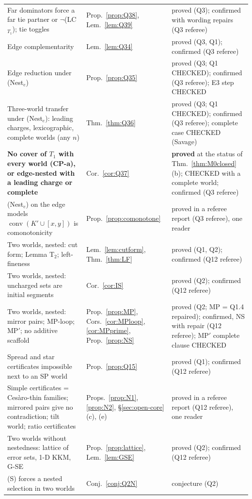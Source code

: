 \documentclass[11pt]{article}
\theoremstyle{definition}
\theoremstyle{remark}
\newcommand{\co}{\operatorname{conv}}
\begin{document}
{\begin{longtable}{>{\raggedright\arraybackslash}p{6.4cm}>{\raggedright\arraybackslash}p{2.1cm}>{\raggedright\arraybackslash}p{5.6cm}}
Far dominators force a far tie partner or $\neg$(LC$_{T_1}$); tie toggles & Prop.~\ref{prop:Q38}, Lem.~\ref{lem:Q39} & proved (Q3); confirmed with wording repairs (Q3 referee)\\
Edge complementarity & Lem.~\ref{lem:Q34} & proved (Q3, Q1); confirmed (Q3 referee)\\
Edge reduction under (Nest$_e$) & Prop.~\ref{prop:Q35} & proved (Q3; Q1 CHECKED); confirmed (Q3 referee); E3 step CHECKED\\
Three-world transfer under (Nest$_e$): leading charges, lexicographic, complete worlds (any $n$) & Thm.~\ref{thm:Q36} & proved (Q3; Q1 CHECKED); confirmed (Q3 referee); complete case CHECKED (Savage)\\
\textbf{No cover of $T_1$ with every world (CP-a), or edge-nested with a leading charge or complete} & Cor.~\ref{cor:Q37} & \textbf{proved} at the status of Thm.~\ref{thm:M0closed}(b); CHECKED with a complete world; confirmed (Q3 referee)\\
(Nest$_e$) on the edge models $\co(K'\cup[x,y])$ is comonotonicity & Prop.~\ref{prop:comonotone} & proved in a referee report (Q3 referee), one reader\\
Two worlds, nested: cut form; Lemma T$_2$; left-fineness & Lem.~\ref{lem:cutform}, Thm.~\ref{thm:LF} & proved (Q1, Q2); confirmed (Q12 referee)\\
Two worlds, nested: uncharged sets are initial segments & Cor.~\ref{cor:IS} & proved (Q2); confirmed (Q12 referee)\\
Two worlds, nested: mirror pairs; MP-loop; MP$'$; no additive scaffold & Prop.~\ref{prop:MP}, Cors.~\ref{cor:MPloop}, \ref{cor:MPprime}, Prop.~\ref{prop:NS} & proved (Q2; MP = Q1.4 repaired); confirmed, NS with repair (Q12 referee); MP$'$ complete clause CHECKED\\
Spread and star certificates impossible next to an SP world & Prop.~\ref{prop:Q15} & proved (Q1); confirmed (Q12 referee)\\
Simple certificates = Ces\`aro-thin families; mirrored pairs give no contradiction; tilt world; ratio certificates & Props.~\ref{prop:N1}, \ref{prop:N2}, \S\ref{sec:open-core}(c), (e) & proved in a referee report (Q12 referee), one reader\\
Two worlds without nestedness: lattice of error sets, 1-D KKM, G-SE & Prop.~\ref{prop:lattice}, Lem.~\ref{lem:GSE} & proved (Q2); confirmed (Q12 referee)\\
(S) forces a nested selection in two worlds & Conj.~\ref{conj:Q2N} & conjecture (Q2)\\

\end{longtable}}
\end{document}
